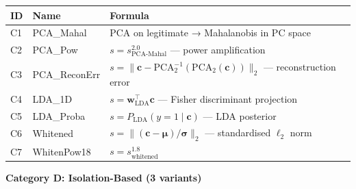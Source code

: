 \documentclass[
  11pt,
]{article}
\newcounter{none} %
\begin{document}
{\def\LTcaptype{none} %
\begin{longtable}[]{@{}
  >{\raggedright\arraybackslash}p{}
  >{\raggedright\arraybackslash}p{}
  >{\raggedright\arraybackslash}p{}@{}}
\toprule\noalign{}
\begin{minipage}[b]{\linewidth}\raggedright
ID
\end{minipage} & \begin{minipage}[b]{\linewidth}\raggedright
Name
\end{minipage} & \begin{minipage}[b]{\linewidth}\raggedright
Formula
\end{minipage} \\
\midrule\noalign{}
\endhead
\bottomrule\noalign{}
\endlastfoot
C1 & PCA\_Mahal & PCA on legitimate → Mahalanobis in PC space \\
C2 & PCA\_Pow & \(s = s_{\text{PCA-Mahal}}^{2.0}\) — power
amplification \\
C3 & PCA\_ReconErr &
\(s = \|\mathbf{c} - \text{PCA}_2^{-1}(\text{PCA}_2(\mathbf{c}))\|_2\) —
reconstruction error \\
C4 & LDA\_1D & \(s = \mathbf{w}_{\text{LDA}}^\top \mathbf{c}\) — Fisher
discriminant projection \\
C5 & LDA\_Proba & \(s = P_{\text{LDA}}(y=1 \mid \mathbf{c})\) — LDA
posterior \\
C6 & Whitened &
\(s = \|(\mathbf{c}-\boldsymbol{\mu})/\boldsymbol{\sigma}\|_2\) —
standardised \(\ell_2\) norm \\
C7 & WhitenPow18 & \(s = s_{\text{whitened}}^{1.8}\) \\
\end{longtable}
}

\textbf{Category D: Isolation-Based (3 variants)}
\end{document}
